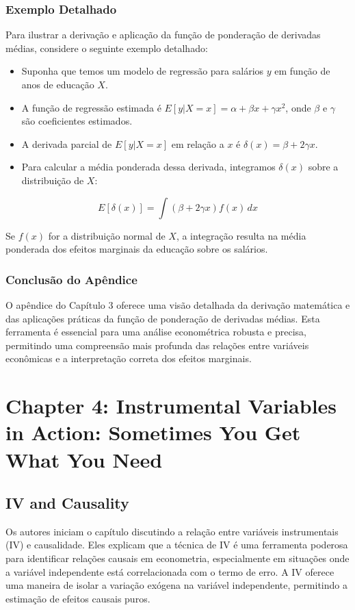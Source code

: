 \documentclass[a4paper,12pt]{article}[abntex2]
\begin{document}
\subsubsection{Exemplo Detalhado}
Para ilustrar a derivação e aplicação da função de ponderação de derivadas médias, considere o seguinte exemplo detalhado:

\begin{itemize}
    \item Suponha que temos um modelo de regressão para salários \( y \) em função de anos de educação \( X \).
    \item A função de regressão estimada é \( E[y|X=x] = \alpha + \beta x + \gamma x^2 \), onde \( \beta \) e \( \gamma \) são coeficientes estimados.
    \item A derivada parcial de \( E[y|X=x] \) em relação a \( x \) é \( \delta(x) = \beta + 2\gamma x \).
    \item Para calcular a média ponderada dessa derivada, integramos \( \delta(x) \) sobre a distribuição de \( X \):
\end{itemize}

\begin{equation}
E[\delta(x)] = \int (\beta + 2\gamma x) f(x) \, dx
\end{equation}

Se \( f(x) \) for a distribuição normal de \( X \), a integração resulta na média ponderada dos efeitos marginais da educação sobre os salários.

\subsubsection{Conclusão do Apêndice}
O apêndice do Capítulo 3 oferece uma visão detalhada da derivação matemática e das aplicações práticas da função de ponderação de derivadas médias. Esta ferramenta é essencial para uma análise econométrica robusta e precisa, permitindo uma compreensão mais profunda das relações entre variáveis econômicas e a interpretação correta dos efeitos marginais.

\newpage

\section{Chapter 4: Instrumental Variables in Action: Sometimes You Get What You Need}

\subsection{IV and Causality}
Os autores iniciam o capítulo discutindo a relação entre variáveis instrumentais (IV) e causalidade. Eles explicam que a técnica de IV é uma ferramenta poderosa para identificar relações causais em econometria, especialmente em situações onde a variável independente está correlacionada com o termo de erro. A IV oferece uma maneira de isolar a variação exógena na variável independente, permitindo a estimação de efeitos causais puros.
\end{document}
